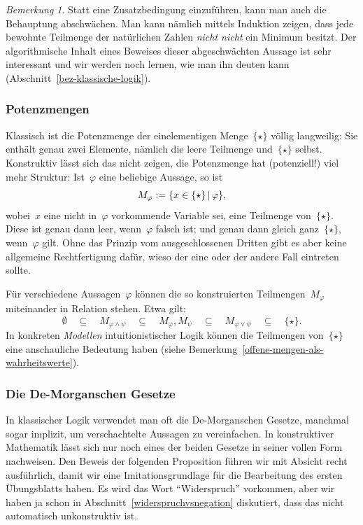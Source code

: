 \documentclass[a4paper,ngerman,12pt]{scrartcl}
\theoremstyle{definition}
\theoremstyle{plain}
\theoremstyle{remark}
\newtheorem{bem}[defn]{Bemerkung}
\renewcommand{\_}{\mathpunct{.}\,}
\newcommand{\?}{\,{:}\,}
\newcommand{\defeq}{\vcentcolon=}
\begin{document}
\begin{bem}Statt eine Zusatzbedingung einzuführen, kann man auch die Behauptung
abschwächen. Man kann nämlich mittels Induktion zeigen, dass jede
bewohnte Teilmenge der natürlichen Zahlen \emph{nicht nicht} ein Minimum
besitzt. Der algorithmische Inhalt eines Beweises dieser abgeschwächten Aussage
ist sehr interessant und wir werden noch lernen, wie man ihn deuten kann
(Abschnitt~\ref{bez-klassische-logik}).\end{bem}


\subsubsection*{Potenzmengen}

Klassisch ist die Potenzmenge der einelementigen Menge~$\{\star\}$ völlig
langweilig: Sie enthält genau zwei Elemente, nämlich die leere Teilmenge
und~$\{\star\}$ selbst. Konstruktiv lässt sich das nicht zeigen, die
Potenzmenge hat (potenziell!) viel mehr Struktur: Ist~$\varphi$ eine beliebige
Aussage, so ist
\[ M_\varphi \defeq \{ x \in \{\star\} \,|\, \varphi \}, \]
wobei~$x$ eine nicht in~$\varphi$ vorkommende Variable sei, eine Teilmenge
von~$\{\star\}$. Diese ist genau dann leer, wenn~$\varphi$ falsch ist; und
genau dann gleich ganz~$\{\star\}$, wenn~$\varphi$ gilt. Ohne das Prinzip vom
ausgeschlossenen Dritten gibt es aber keine allgemeine Rechtfertigung dafür,
wieso der eine oder der andere Fall eintreten sollte.

Für verschiedene Aussagen~$\varphi$ können die so konstruierten
Teilmengen~$M_\varphi$ miteinander in Relation stehen. Etwa gilt:
\[ \emptyset \quad\subseteq\quad M_{\varphi \wedge \psi}
  \quad\subseteq\quad M_\varphi, M_\psi \quad\subseteq\quad
  M_{\varphi \vee \psi} \quad\subseteq\quad
  \{\star\}. \]
In konkreten \emph{Modellen} intuitionistischer Logik können die Teilmengen
von~$\{\star\}$ eine anschauliche Bedeutung haben (siehe
Bemerkung~\ref{offene-mengen-als-wahrheitswerte}).


\subsubsection*{Die De-Morganschen Gesetze}

In klassischer Logik verwendet man oft die De-Morganschen Gesetze, manchmal
sogar implizit, um verschachtelte Aussagen zu vereinfachen. In konstruktiver
Mathematik lässt sich nur noch eines der beiden Gesetze in seiner vollen Form
nachweisen. Den Beweis der folgenden Proposition führen wir mit Absicht recht
ausführlich, damit wir eine Imitationsgrundlage für die Bearbeitung des ersten
Übungsblatts haben. Es wird das Wort "`Widerspruch"' vorkommen, aber wir haben ja
schon in Abschnitt~\ref{widerspruchvsnegation} diskutiert, dass das nicht
automatisch unkonstruktiv ist.
\end{document}
